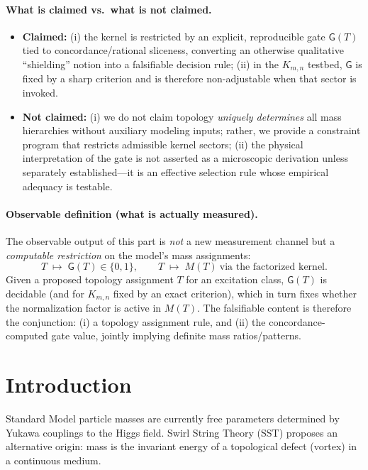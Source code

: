 \documentclass[11pt, a4paper]{article}
\begin{document}
\paragraph{What is claimed vs.\ what is not claimed.}
\begin{itemize}
  \item \textbf{Claimed:} (i) the kernel is restricted by an explicit, reproducible gate $\mathsf{G}(T)$ tied to concordance/rational sliceness, converting an otherwise qualitative ``shielding'' notion into a falsifiable decision rule; (ii) in the $K_{m,n}$ testbed, $\mathsf{G}$ is fixed by a sharp criterion and is therefore non-adjustable when that sector is invoked.
  \item \textbf{Not claimed:} (i) we do not claim topology \emph{uniquely determines} all mass hierarchies without auxiliary modeling inputs; rather, we provide a constraint program that restricts admissible kernel sectors; (ii) the physical interpretation of the gate is not asserted as a microscopic derivation unless separately established---it is an effective selection rule whose empirical adequacy is testable.
\end{itemize}

\paragraph{Observable definition (what is actually measured).}
The observable output of this part is \emph{not} a new measurement channel but a \emph{computable restriction} on the model's mass assignments:
\[
T \;\longmapsto\; \mathsf{G}(T)\in\{0,1\},\qquad
T \;\longmapsto\; M(T)\ \text{via the factorized kernel.}
\]
Given a proposed topology assignment $T$ for an excitation class, $\mathsf{G}(T)$ is decidable (and for $K_{m,n}$ fixed by an exact criterion), which in turn fixes whether the normalization factor is active in $M(T)$. The falsifiable content is therefore the conjunction:
(i) a topology assignment rule, and (ii) the concordance-computed gate value, jointly implying definite mass ratios/patterns.

\section{Introduction}
Standard Model particle masses are currently free parameters determined by Yukawa couplings to the Higgs field. Swirl String Theory (SST) proposes an alternative origin: mass is the invariant energy of a topological defect (vortex) in a continuous medium.
\end{document}
